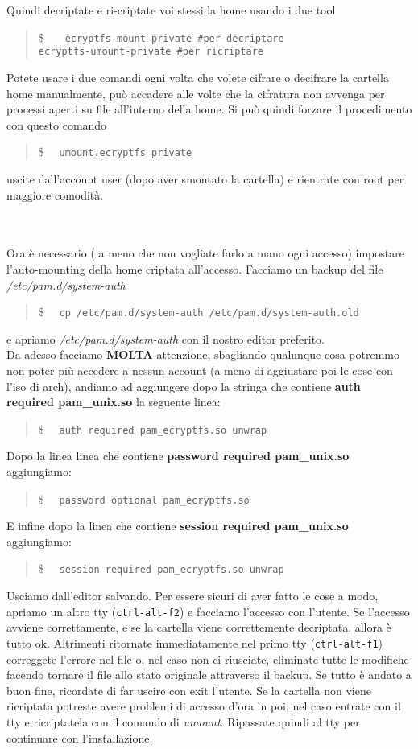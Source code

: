 \documentclass[twoside,italian]{book}
\newcommand{\code}[1]{\texttt{#1}}
\newcommand{\shellcode}[1]{\$$\quad$ \texttt{#1}}
\newcommand{\centcode}[1]{
	\begin{quote}
		\color{code}
		\shellcode{#1}
	\end{quote}
}
\newcommand{\nlinea}{
	\leavevmode
	\\
}
\begin{document}
    Quindi  decriptate e ri-criptate voi stessi la home usando i due tool \centcode{
        ecryptfs-mount-private \#per decriptare\\
        ecryptfs-umount-private \#per ricriptare
    }

    Potete usare i due comandi ogni volta che volete cifrare o decifrare la cartella home manualmente, può accadere alle volte che la cifratura non avvenga per processi aperti su file all'interno della home. Si può quindi forzare il procedimento con questo comando \centcode{umount.ecryptfs\_private}

    uscite dall'account user (dopo aver smontato la cartella) e rientrate con root per maggiore comodità.
    \nlinea
    \nlinea
    Ora è necessario ( a meno che non vogliate farlo a mano ogni accesso) impostare l'auto-mounting della home criptata all'accesso.
    Facciamo un backup del file \textit{/etc/pam.d/system-auth} \centcode{cp /etc/pam.d/system-auth /etc/pam.d/system-auth.old}e apriamo \textit{/etc/pam.d/system-auth} con il nostro editor preferito.\\
    Da adesso facciamo \textbf{MOLTA} attenzione, sbagliando qualunque cosa potremmo non poter più accedere a nessun account (a meno di aggiustare poi le cose con l'iso di arch), andiamo ad aggiungere dopo la stringa che contiene \textbf{auth required pam\_unix.so} la seguente linea:
    \centcode{auth    required    pam\_ecryptfs.so unwrap}

    Dopo la linea linea che contiene \textbf{password required pam\_unix.so} aggiungiamo: \centcode{password    optional    pam\_ecryptfs.so}

    E infine dopo la linea che contiene \textbf{session required pam\_unix.so} aggiungiamo:\centcode{session required pam\_ecryptfs.so unwrap}
    Usciamo dall'editor salvando. Per essere sicuri di aver fatto le cose a modo, apriamo un altro tty (\code{ctrl-alt-f2}) e facciamo l'accesso con l'utente. Se l'accesso avviene correttamente, e se la cartella viene correttemente decriptata, allora è tutto ok. Altrimenti ritornate immediatamente nel primo tty (\code{ctrl-alt-f1})  correggete l'errore nel file o, nel caso non ci riusciate, eliminate tutte le modifiche facendo tornare il file allo stato originale attraverso il backup.
    Se tutto è andato a buon fine, ricordate di far uscire con exit l'utente. Se la cartella non viene ricriptata potreste avere problemi di accesso d'ora in poi, nel caso entrate con il tty e ricriptatela con il comando di \textit{umount}.
    Ripassate quindi al tty per continuare con l'installazione.
\end{document}
